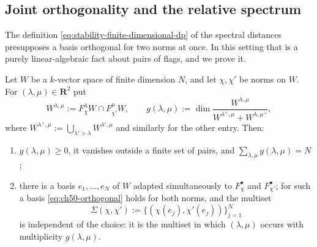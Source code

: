 \subsection{Joint orthogonality and the relative spectrum}
\label{sec:ch50-joint}

The definition \eqref{eq:stability-finite-dimensional-dp} of the spectral
distances presupposes a basis orthogonal for two norms at once.  In this
setting that is a purely linear-algebraic fact about pairs of flags, and we
prove it.

\par\noindent\begin{minipage}{\textwidth}
\begin{theorem}
\label{thm:ch50-joint-orthogonal}
Let $W$ be a $k$-vector space of finite dimension $N$, and let
$\chi,\chi'$ be norms on $W$.  For $(\lambda,\mu)\in\mathbf R^2$ put
\[
 W^{\lambda,\mu}:=F^\lambda_\chi W\cap F^\mu_{\chi'}W,
 \qquad
 g(\lambda,\mu):=\dim\frac{W^{\lambda,\mu}}
   {W^{\lambda^+,\mu}+W^{\lambda,\mu^+}},
\tag{50.6}\label{eq:ch50-bigraded}
\]
where $W^{\lambda^+,\mu}:=\bigcup_{\lambda'>\lambda}W^{\lambda',\mu}$ and
similarly for the other entry.  Then:
\begin{enumerate}
\item\label{itm:ch50-jo:count}
      $g(\lambda,\mu)\ge0$, it vanishes outside a finite set of pairs,
      and $\sum_{\lambda,\mu}g(\lambda,\mu)=N$;
\item\label{itm:ch50-jo:basis}
      there is a basis $e_1,\dots,e_N$ of $W$ adapted simultaneously to
      $F^\bullet_\chi$ and $F^\bullet_{\chi'}$; for such a basis
      \eqref{eq:ch50-orthogonal} holds for both norms, and the multiset
      \[
       \Sigma(\chi,\chi'):=\bigl\{(\chi(e_j),\chi'(e_j))\bigr\}_{j=1}^N
      \]
      is independent of the choice: it is the multiset in which
      $(\lambda,\mu)$ occurs with multiplicity $g(\lambda,\mu)$.
\end{enumerate}
\end{theorem}
\end{minipage}\par\medskip

